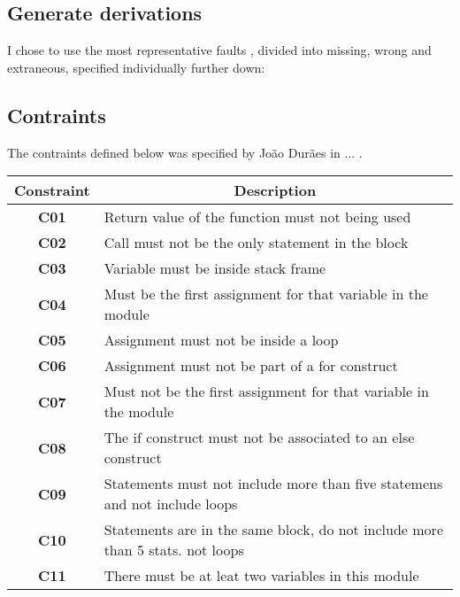 \subsection{Generate derivations}

I chose to use the most representative faults \cite{duraes2006emulation}, divided into missing, wrong and extraneous, specified individually further down:

\subsection{Contraints}

The contraints defined below was specified by João Durães in ... .

\begin{table}[h]
\begin{tabular}{|c|l|}
\hline
\textbf{Constraint}             & \multicolumn{1}{c|}{\textbf{Description}}                                     \\ \hline
\textbf{C01}       \label{C01}  & Return value of the function must not being used                              \\ \hline
\textbf{C02}       \label{C02}  & Call must not be the only statement in the block                              \\ \hline
\textbf{C03}       \label{C03}  & Variable must be inside stack frame                                           \\ \hline
\textbf{C04}       \label{C04}  & Must be the first assignment for that variable in the module                  \\ \hline
\textbf{C05}       \label{C05}  & Assignment must not be inside a loop                                          \\ \hline
\textbf{C06}       \label{C06}  & Assignment must not be part of a for construct                                \\ \hline
\textbf{C07}       \label{C07}  & Must not be the first assignment for that variable in the module              \\ \hline
\textbf{C08}       \label{C08}  & The if construct must not be associated to an else construct                  \\ \hline
\textbf{C09}       \label{C09}  & Statements must not include more than five statemens and not include loops    \\ \hline
\textbf{C10}       \label{C010} & Statements are in the same block, do not include more than 5 stats. not loops \\ \hline
\textbf{C11}       \label{C011} & There must be at leat two variables in this module                            \\ \hline
\end{tabular}
\end{table}

